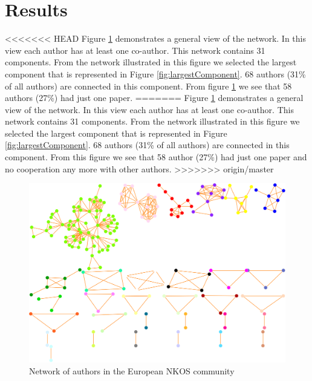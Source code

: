 \documentclass[runningheads,a4paper]{llncs}
\begin{document}
\section{Results}\label{results}

<<<<<<< HEAD
Figure \ref{fig:wholenet} demonstrates a general view of the network. In this view each author has at least one co-author. This network contains 31 components. From the network illustrated in this figure we selected the largest component that is represented in Figure \ref{fig:largestComponent}. 68 authors (31\% of all authors) are connected in this component. 
From figure \ref{fig:wholenet} we see that 58 authors (27\%) had just one paper.
=======
Figure \ref{fig:wholenet} demonstrates a general view of the network. In this view each author has at least one co-author. This network contains 31 components. From the network illustrated in this figure we selected the largest component that is represented in Figure \ref{fig:largestComponent}. 68 authors (31\% of all authors) are connected in this component. From this figure we see that 58 author (27\%) had just one paper and no cooperation any more with other authors.
>>>>>>> origin/master


\begin{figure}
	\centering
	\includegraphics[width=1.0\linewidth]{wholeNet}
	\vspace{-0.5em}
	\caption{Network of authors in the European NKOS community}
	\label{fig:wholenet}
	\vspace{-0.5em}
\end{figure}

\end{document}
